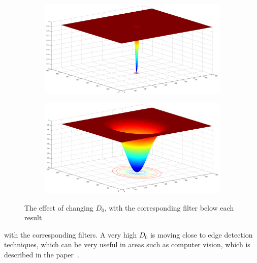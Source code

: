 \begin{figure}[h!]
\begin{subfigure}[b]{0.5\linewidth}
				\label{fig:high_sigma}
			\end{subfigure}
			\label{fig:sigma}
			\begin{subfigure}[b]{0.5\linewidth}
				\includegraphics[width=0.9\linewidth]{pics/low_sigma_filter.png}
				\caption{}
				\label{fig:low_sigma_filter}
			\end{subfigure}%
			\begin{subfigure}[b]{0.5\linewidth}
				\includegraphics[width=0.9\linewidth]{pics/high_sigma_filter.png}
				\caption{}
				\label{fig:high_sigma_filter}
			\end{subfigure}
			\label{fig:sigma}
		\caption{The effect of changing $D_0$, with the corresponding filter below each result}				
		\end{figure}
		with the corresponding filters. A very high $D_0$ is moving close to edge detection
		techniques,
		which can be very useful in areas such as computer vision, which is described in 
		the paper~\cite{Fan20111468}.\\
